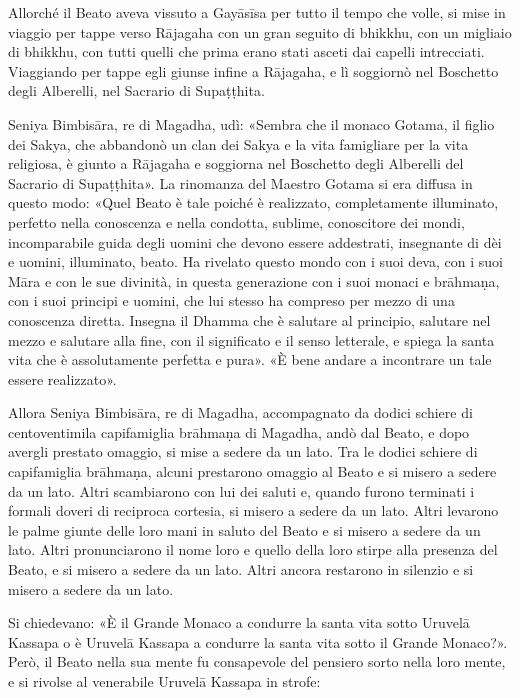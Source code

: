 

Allorché il Beato aveva vissuto a Gayāsīsa per tutto il tempo che volle,
si mise in viaggio per tappe verso Rājagaha con un gran seguito di
bhikkhu, con un migliaio di bhikkhu, con tutti quelli che prima erano
stati asceti dai capelli intrecciati. Viaggiando per tappe egli giunse
infine a Rājagaha, e lì soggiornò nel Boschetto degli Alberelli, nel
Sacrario di Supaṭṭhita.


Seniya Bimbisāra, re di Magadha, udì: «Sembra che il monaco Gotama, il
figlio dei Sakya, che abbandonò un clan dei Sakya e la vita famigliare
per la vita religiosa, è giunto a Rājagaha e soggiorna nel Boschetto
degli Alberelli del Sacrario di Supaṭṭhita». La rinomanza del Maestro
Gotama si era diffusa in questo modo: «Quel Beato è tale poiché è
realizzato, completamente illuminato, perfetto nella conoscenza e nella
condotta, sublime, conoscitore dei mondi, incomparabile guida degli
uomini che devono essere addestrati, insegnante di dèi e uomini,
illuminato, beato. Ha rivelato questo mondo con i suoi deva, con i suoi
Māra e con le sue divinità, in questa generazione con i suoi monaci e
brāhmaṇa, con i suoi principi e uomini, che lui stesso ha compreso per
mezzo di una conoscenza diretta. Insegna il Dhamma che è salutare al
principio, salutare nel mezzo e salutare alla fine, con il significato e
il senso letterale, e spiega la santa vita che è assolutamente perfetta
e pura». «È bene andare a incontrare un tale essere realizzato».


Allora Seniya Bimbisāra, re di Magadha, accompagnato da dodici schiere
di centoventimila capifamiglia brāhmaṇa di Magadha, andò dal Beato, e
dopo avergli prestato omaggio, si mise a sedere da un lato. Tra le
dodici schiere di capifamiglia brāhmaṇa, alcuni prestarono omaggio al
Beato e si misero a sedere da un lato. Altri scambiarono con lui dei
saluti e, quando furono terminati i formali doveri di reciproca
cortesia, si misero a sedere da un lato. Altri levarono le palme giunte
delle loro mani in saluto del Beato e si misero a sedere da un lato.
Altri pronunciarono il nome loro e quello della loro stirpe alla
presenza del Beato, e si misero a sedere da un lato. Altri ancora
restarono in silenzio e si misero a sedere da un lato.


Si chiedevano: «È il Grande Monaco a condurre la santa vita sotto
Uruvelā Kassapa o è Uruvelā Kassapa a condurre la santa vita sotto il
Grande Monaco?». Però, il Beato nella sua mente fu consapevole del
pensiero sorto nella loro mente, e si rivolse al venerabile Uruvelā
Kassapa in strofe:


